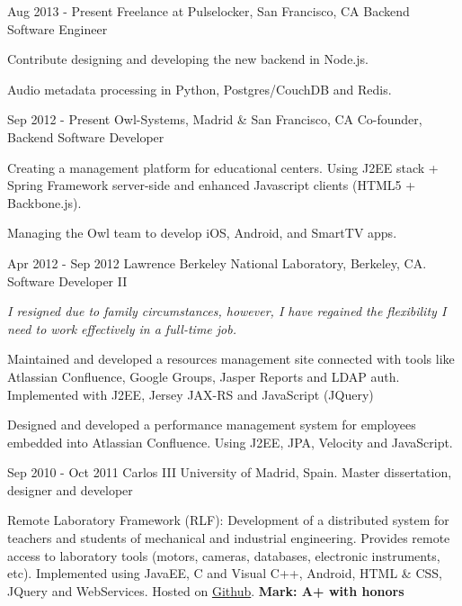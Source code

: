
\experience
  {Aug 2013 - Present}
  {Freelance at Pulselocker, San Francisco, CA}
  {Backend Software Engineer}
  {\vspace{-1em}\begin{rlist}
    \item Contribute designing and developing the new backend in Node.js.
    \item Audio metadata processing in Python, Postgres/CouchDB and Redis.
  \end{rlist}}

\experience
  {Sep 2012 - Present}
  {Owl-Systems, Madrid \& San Francisco, CA}
  {Co-founder, Backend Software Developer}
  {\vspace{-1em}\begin{rlist}
    \item Creating a management platform for educational centers. Using J2EE stack +
    Spring Framework server-side and enhanced Javascript clients (HTML5 +
    Backbone.js).
    \item Managing the Owl team to develop iOS, Android, and SmartTV apps.
  \end{rlist}}

\experience
  {Apr 2012 - Sep 2012}
  {Lawrence Berkeley National Laboratory, Berkeley, CA.}
  {Software Developer II}
  {\emph{I resigned due to family circumstances, however, I have
    regained the flexibility I need to work effectively in a full-time
    job.}
    \begin{rlist}
    \item Maintained and developed a resources management site
    connected with tools like Atlassian Confluence, Google Groups, Jasper
    Reports and LDAP auth. Implemented with J2EE, Jersey JAX-RS and
    JavaScript (JQuery)
    \item Designed and developed a performance management system for
    employees embedded into Atlassian Confluence. Using J2EE, JPA,
    Velocity and JavaScript.
  \end{rlist}}

\experience
  {Sep 2010 - Oct 2011}
  {Carlos III University of Madrid, Spain.}
  {Master dissertation, designer and developer}
  {\vspace{-1em}\begin{rlist}
    \item Remote Laboratory Framework (RLF): Development of a distributed
    system for teachers and students of mechanical and industrial
    engineering. Provides remote access to laboratory tools (motors,
    cameras, databases, electronic instruments, etc).
    Implemented using JavaEE, C and Visual C++,
    Android, HTML \& CSS, JQuery and WebServices. Hosted on \href{https://github.com/CarlosMecha/remote-laboratory-framework}{Github}.
    \textbf{Mark: A+ with honors}
  \end{rlist}}

